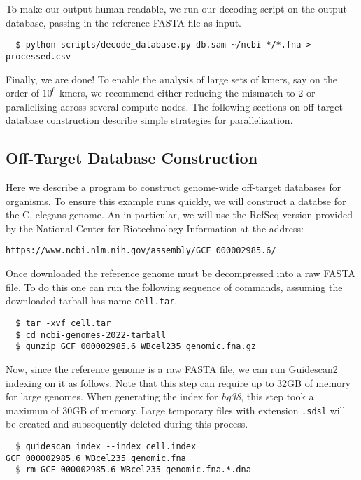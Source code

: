 \documentclass[11pt]{article}
\begin{document}
To make our output human readable, we run our decoding script on the
output database, passing in the reference FASTA file as input.
\vspace{-0.8em}
\begin{verbatim}
  $ python scripts/decode_database.py db.sam ~/ncbi-*/*.fna > processed.csv
\end{verbatim}

Finally, we are done! To enable the analysis of large sets of kmers,
say on the order of $10^6$ kmers, we recommend either reducing the
mismatch to 2 or parallelizing across several compute nodes. The
following sections on off-target database construction describe simple
strategies for parallelization.

\subsection{Off-Target Database Construction}
\label{subsec:offtargetdb}

Here we describe a program to construct genome-wide off-target
databases for organisms. To ensure this example runs quickly, we will
construct a databse for the C. elegans genome. An in particular, we
will use the RefSeq version provided by the National Center for
Biotechnology Information at the address:

\begin{center}
  \texttt{https://www.ncbi.nlm.nih.gov/assembly/GCF\_000002985.6/}
\end{center}

Once downloaded the reference genome must be decompressed into a raw
FASTA file.  To do this one can run the following sequence of
commands, assuming the downloaded tarball has name \texttt{cell.tar}.

\begin{verbatim}
  $ tar -xvf cell.tar
  $ cd ncbi-genomes-2022-tarball
  $ gunzip GCF_000002985.6_WBcel235_genomic.fna.gz
\end{verbatim}

Now, since the reference genome is a raw FASTA file, we can run
Guidescan2 indexing on it as follows. Note that this step can require
up to 32GB of memory for large genomes. When generating the index for
\textit{hg38}, this step took a maximum of 30GB of memory. Large
temporary files with extension \texttt{.sdsl} will be created and
subsequently deleted during this process.

\begin{verbatim}
  $ guidescan index --index cell.index GCF_000002985.6_WBcel235_genomic.fna
  $ rm GCF_000002985.6_WBcel235_genomic.fna.*.dna
\end{verbatim}
\end{document}
